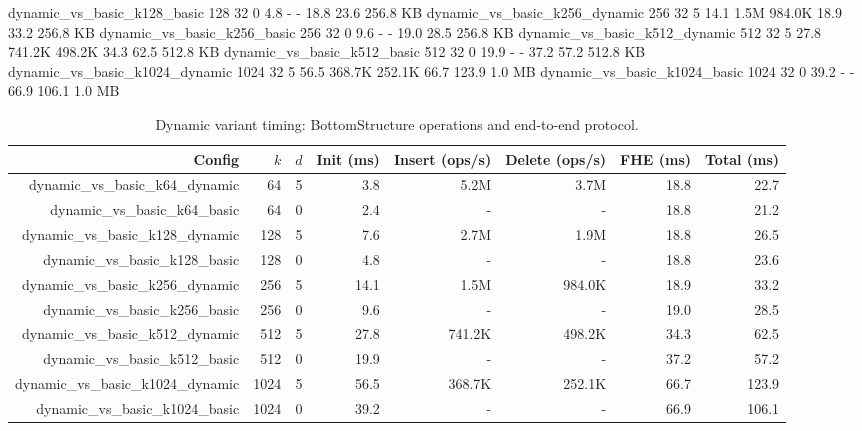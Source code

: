      dynamic_vs_basic_k128_basic   128  32   0        4.8               -               -          18.8        23.6  256.8 KB
   dynamic_vs_basic_k256_dynamic   256  32   5       14.1            1.5M          984.0K          18.9        33.2  256.8 KB
     dynamic_vs_basic_k256_basic   256  32   0        9.6               -               -          19.0        28.5  256.8 KB
   dynamic_vs_basic_k512_dynamic   512  32   5       27.8          741.2K          498.2K          34.3        62.5  512.8 KB
     dynamic_vs_basic_k512_basic   512  32   0       19.9               -               -          37.2        57.2  512.8 KB
  dynamic_vs_basic_k1024_dynamic  1024  32   5       56.5          368.7K          252.1K          66.7       123.9    1.0 MB
    dynamic_vs_basic_k1024_basic  1024  32   0       39.2               -               -          66.9       106.1    1.0 MB

\begin{table}[t]
\centering
\caption{Dynamic variant timing: BottomStructure operations and end-to-end protocol.}
\label{tab:dynamic-timing}
\begin{tabular}{rrrrrrrr}
\toprule
Config & $k$ & $d$ & Init (ms) & Insert (ops/s) & Delete (ops/s) & FHE (ms) & Total (ms) \\
\midrule
dynamic\_vs\_basic\_k64\_dynamic & 64 & 5 & 3.8 & 5.2M & 3.7M & 18.8 & 22.7 \\
dynamic\_vs\_basic\_k64\_basic & 64 & 0 & 2.4 & - & - & 18.8 & 21.2 \\
dynamic\_vs\_basic\_k128\_dynamic & 128 & 5 & 7.6 & 2.7M & 1.9M & 18.8 & 26.5 \\
dynamic\_vs\_basic\_k128\_basic & 128 & 0 & 4.8 & - & - & 18.8 & 23.6 \\
dynamic\_vs\_basic\_k256\_dynamic & 256 & 5 & 14.1 & 1.5M & 984.0K & 18.9 & 33.2 \\
dynamic\_vs\_basic\_k256\_basic & 256 & 0 & 9.6 & - & - & 19.0 & 28.5 \\
dynamic\_vs\_basic\_k512\_dynamic & 512 & 5 & 27.8 & 741.2K & 498.2K & 34.3 & 62.5 \\
dynamic\_vs\_basic\_k512\_basic & 512 & 0 & 19.9 & - & - & 37.2 & 57.2 \\
dynamic\_vs\_basic\_k1024\_dynamic & 1024 & 5 & 56.5 & 368.7K & 252.1K & 66.7 & 123.9 \\
dynamic\_vs\_basic\_k1024\_basic & 1024 & 0 & 39.2 & - & - & 66.9 & 106.1 \\
\bottomrule
\end{tabular}
\end{table}


